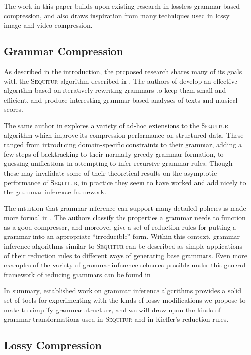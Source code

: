 \documentclass[11pt]{article}
\newcommand{\Sequitur}{\textsc{Sequitur}\xspace}
\begin{document}
The work in this paper builds upon existing research in lossless grammar based
compression, and also draws inspiration from many techniques used in lossy
image and video compression.

\subsection{Grammar Compression}

As described in the introduction, the proposed research shares many of its
goals with the \Sequitur algorithm described in \cite{sequitur}.  The authors
of \cite{sequitur} develop an effective algorithm based on iteratively
rewriting grammars to keep them small and efficient, and produce interesting
grammar-based analyses of texts and musical scores.

The same author in \cite{nevillphd} explores a variety of ad-hoc extensions to
the \Sequitur algorithm which improve its compression performance on structured
data.  These ranged from introducing domain-specific constraints to their
grammar, adding a few steps of backtracking to their normally greedy grammar
formation, to guessing unifications in attempting to infer recursive grammar
rules.  Though these may invalidate some of their theoretical results on the
asymptotic performance of \Sequitur, in practice they seem to have worked and
add nicely to the grammar inference framework.

The intuition that grammar inference can support many detailed policies is made
more formal in \cite{grammarcodes}.  The authors classify the properties a
grammar needs to function as a good compressor, and moreover give a set of
reduction rules for putting a grammar into an appropriate ``irreducible'' form.
Within this context, grammar inference algorithms similar to \Sequitur can be
described as simple applications of their reduction rules to different ways of
generating base grammars.  Even more examples of the variety of grammar
inference schemes possible under this general framework of reducing grammars
can be found in \cite{efficientgreedy}

In summary, established work on grammar inference algorithms provides a solid
set of tools for experimenting with the kinds of lossy modifications we
propose to make to simplify grammar structure, and we will draw upon the kinds
of grammar transformations used in \Sequitur and in Kieffer's reduction rules.

\subsection{Lossy Compression}
\end{document}
